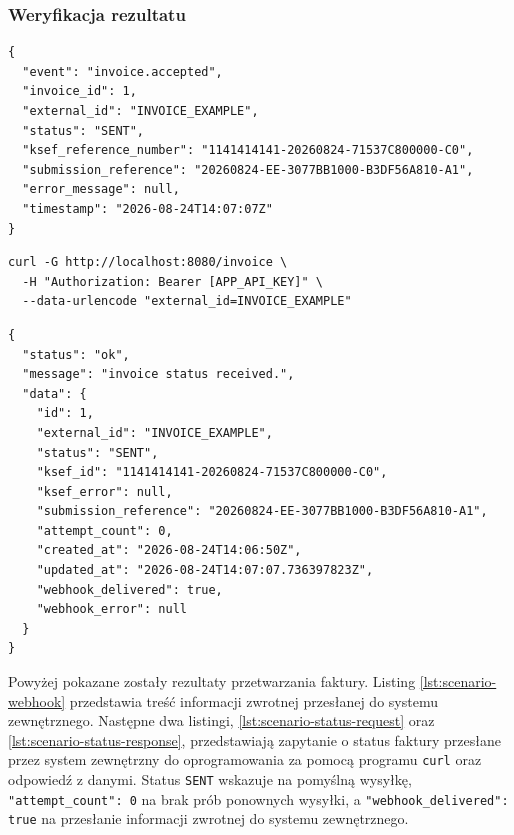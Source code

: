 \subsubsection{Weryfikacja rezultatu}

\begin{lstlisting}[style=thesiscode, caption={Webhook wysłany do systemu zewnętrznego}, label={lst:scenario-webhook}]
{
  "event": "invoice.accepted",
  "invoice_id": 1,
  "external_id": "INVOICE_EXAMPLE",
  "status": "SENT",
  "ksef_reference_number": "1141414141-20260824-71537C800000-C0",
  "submission_reference": "20260824-EE-3077BB1000-B3DF56A810-A1",
  "error_message": null,
  "timestamp": "2026-08-24T14:07:07Z"
}
\end{lstlisting}

\begin{lstlisting}[style=thesiscode, caption={Zapytanie o końcowy status faktury}, label={lst:scenario-status-request}]
curl -G http://localhost:8080/invoice \
  -H "Authorization: Bearer [APP_API_KEY]" \
  --data-urlencode "external_id=INVOICE_EXAMPLE"
\end{lstlisting}

\begin{lstlisting}[style=thesiscode, caption={Końcowy status faktury zwrócony przez aplikację}, label={lst:scenario-status-response}]
{
  "status": "ok",
  "message": "invoice status received.",
  "data": {
    "id": 1,
    "external_id": "INVOICE_EXAMPLE",
    "status": "SENT",
    "ksef_id": "1141414141-20260824-71537C800000-C0",
    "ksef_error": null,
    "submission_reference": "20260824-EE-3077BB1000-B3DF56A810-A1",
    "attempt_count": 0,
    "created_at": "2026-08-24T14:06:50Z",
    "updated_at": "2026-08-24T14:07:07.736397823Z",
    "webhook_delivered": true,
    "webhook_error": null
  }
}
\end{lstlisting}

Powyżej pokazane zostały rezultaty przetwarzania faktury. Listing \ref{lst:scenario-webhook} przedstawia treść informacji zwrotnej przesłanej do systemu zewnętrznego. Następne dwa listingi, \ref{lst:scenario-status-request} oraz \ref{lst:scenario-status-response}, przedstawiają zapytanie o status faktury przesłane przez system zewnętrzny do oprogramowania za pomocą programu \texttt{curl} oraz odpowiedź z danymi. Status \texttt{SENT} wskazuje na pomyślną wysyłkę, \texttt{"attempt\_count": 0} na brak prób ponownych wysyłki, a \texttt{"webhook\_delivered": true} na przesłanie informacji zwrotnej do systemu zewnętrznego.

